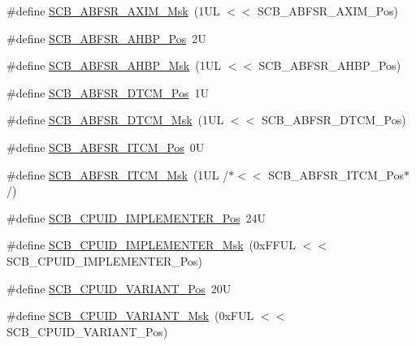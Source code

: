 \begin{DoxyCompactItemize}
\item 
\#define \hyperlink{group___c_m_s_i_s___s_c_b_gac24348e5ec8392f4a076c7ba690aae48}{S\-C\-B\-\_\-\-A\-B\-F\-S\-R\-\_\-\-A\-X\-I\-M\-\_\-\-Msk}~(1\-U\-L $<$$<$ S\-C\-B\-\_\-\-A\-B\-F\-S\-R\-\_\-\-A\-X\-I\-M\-\_\-\-Pos)
\item 
\#define \hyperlink{group___c_m_s_i_s___s_c_b_ga5c97d4cc05972dc80963e74eb2332841}{S\-C\-B\-\_\-\-A\-B\-F\-S\-R\-\_\-\-A\-H\-B\-P\-\_\-\-Pos}~2\-U
\item 
\#define \hyperlink{group___c_m_s_i_s___s_c_b_gabfc67aa93bca5ddd4b0f0a47b372383e}{S\-C\-B\-\_\-\-A\-B\-F\-S\-R\-\_\-\-A\-H\-B\-P\-\_\-\-Msk}~(1\-U\-L $<$$<$ S\-C\-B\-\_\-\-A\-B\-F\-S\-R\-\_\-\-A\-H\-B\-P\-\_\-\-Pos)
\item 
\#define \hyperlink{group___c_m_s_i_s___s_c_b_ga46e22bfb92f4344807714dfa987b7cf3}{S\-C\-B\-\_\-\-A\-B\-F\-S\-R\-\_\-\-D\-T\-C\-M\-\_\-\-Pos}~1\-U
\item 
\#define \hyperlink{group___c_m_s_i_s___s_c_b_ga0f48b9b3b5e79c83383ff9506a75f423}{S\-C\-B\-\_\-\-A\-B\-F\-S\-R\-\_\-\-D\-T\-C\-M\-\_\-\-Msk}~(1\-U\-L $<$$<$ S\-C\-B\-\_\-\-A\-B\-F\-S\-R\-\_\-\-D\-T\-C\-M\-\_\-\-Pos)
\item 
\#define \hyperlink{group___c_m_s_i_s___s_c_b_gaf7c22a977aed73cd51317c25286e81c6}{S\-C\-B\-\_\-\-A\-B\-F\-S\-R\-\_\-\-I\-T\-C\-M\-\_\-\-Pos}~0\-U
\item 
\#define \hyperlink{group___c_m_s_i_s___s_c_b_gaa8cd31cf3adbe7445c733c0a0a4779da}{S\-C\-B\-\_\-\-A\-B\-F\-S\-R\-\_\-\-I\-T\-C\-M\-\_\-\-Msk}~(1\-U\-L /$\ast$$<$$<$ S\-C\-B\-\_\-\-A\-B\-F\-S\-R\-\_\-\-I\-T\-C\-M\-\_\-\-Pos$\ast$/)
\item 
\#define \hyperlink{group___c_m_s_i_s___s_c_b_ga58686b88f94f789d4e6f429fe1ff58cf}{S\-C\-B\-\_\-\-C\-P\-U\-I\-D\-\_\-\-I\-M\-P\-L\-E\-M\-E\-N\-T\-E\-R\-\_\-\-Pos}~24\-U
\item 
\#define \hyperlink{group___c_m_s_i_s___s_c_b_ga0932b31faafd47656a03ced75a31d99b}{S\-C\-B\-\_\-\-C\-P\-U\-I\-D\-\_\-\-I\-M\-P\-L\-E\-M\-E\-N\-T\-E\-R\-\_\-\-Msk}~(0x\-F\-F\-U\-L $<$$<$ S\-C\-B\-\_\-\-C\-P\-U\-I\-D\-\_\-\-I\-M\-P\-L\-E\-M\-E\-N\-T\-E\-R\-\_\-\-Pos)
\item 
\#define \hyperlink{group___c_m_s_i_s___s_c_b_ga104462bd0815391b4044a70bd15d3a71}{S\-C\-B\-\_\-\-C\-P\-U\-I\-D\-\_\-\-V\-A\-R\-I\-A\-N\-T\-\_\-\-Pos}~20\-U
\item 
\#define \hyperlink{group___c_m_s_i_s___s_c_b_gad358dfbd04300afc1824329d128b99e8}{S\-C\-B\-\_\-\-C\-P\-U\-I\-D\-\_\-\-V\-A\-R\-I\-A\-N\-T\-\_\-\-Msk}~(0x\-F\-U\-L $<$$<$ S\-C\-B\-\_\-\-C\-P\-U\-I\-D\-\_\-\-V\-A\-R\-I\-A\-N\-T\-\_\-\-Pos)
$$
\end{DoxyCompactItemize}
